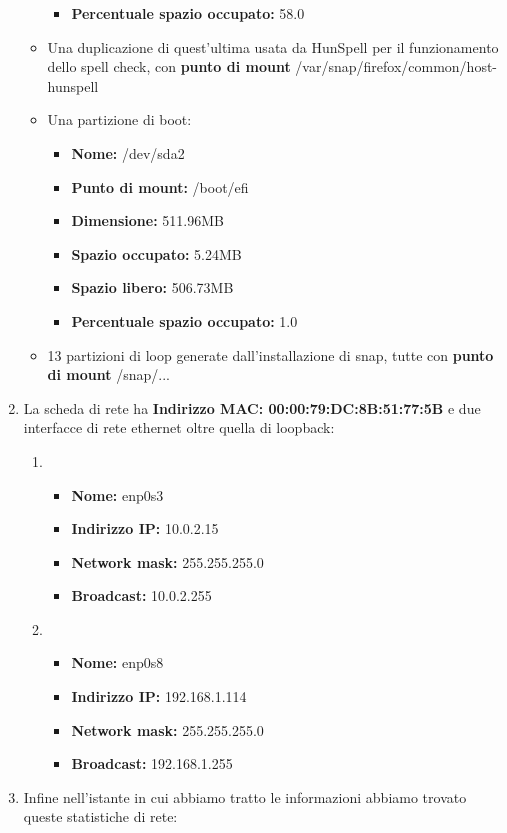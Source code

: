 \documentclass[a4paper]{report}
\begin{document}
\begin{enumerate}
\begin{itemize}
\begin{itemize}
			\item \textbf{Percentuale spazio occupato:} 58.0%
		\end{itemize}
		\item Una duplicazione di quest'ultima usata da HunSpell per il funzionamento dello spell check, con \textbf{punto di mount} /var/snap/firefox/common/host-hunspell
		\item Una partizione di boot:
		\begin{itemize}
			\item \textbf{Nome:} /dev/sda2
			\item \textbf{Punto di mount:} /boot/efi
			\item \textbf{Dimensione:} 511.96MB
			\item \textbf{Spazio occupato:} 5.24MB
			\item \textbf{Spazio libero:} 506.73MB
			\item \textbf{Percentuale spazio occupato:} 1.0%
		\end{itemize}
		\item 13 partizioni di loop generate dall'installazione di snap, tutte con \textbf{punto di mount} /snap/...
	\end{itemize}
	\item La scheda di rete ha \textbf{Indirizzo MAC: 00:00:79:DC:8B:51:77:5B} e due interfacce di rete ethernet oltre quella di loopback:
	\begin{enumerate}
		\item 
		\begin{itemize}
			\item \textbf{Nome:} enp0s3
			\item \textbf{Indirizzo IP:} 10.0.2.15
			\item \textbf{Network mask: }255.255.255.0
			\item \textbf{Broadcast:} 10.0.2.255
		\end{itemize}
		\item 
		\begin{itemize}
			\item \textbf{Nome:} enp0s8
			\item \textbf{Indirizzo IP:} 192.168.1.114
			\item \textbf{Network mask: }255.255.255.0
			\item \textbf{Broadcast:} 192.168.1.255
		\end{itemize}
	\end{enumerate}
	\item Infine nell'istante in cui abbiamo tratto le informazioni abbiamo trovato queste statistiche di rete:

\end{enumerate}
\end{document}
